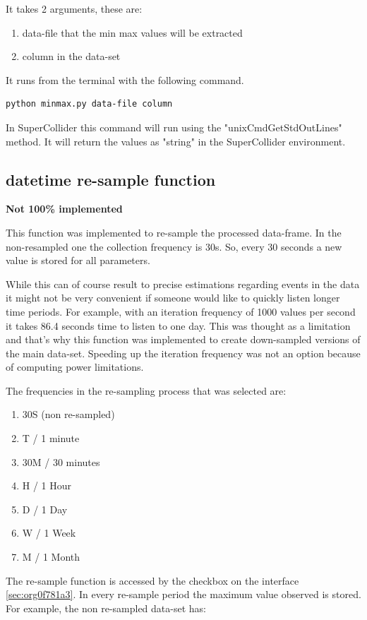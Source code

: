 \documentclass[11pt]{article}
\begin{document}
It takes 2 arguments, these are:
\begin{enumerate}
\item data-file that the min max values will be extracted
\item column in the data-set
\end{enumerate}

It runs from the terminal with the following command.
\begin{verbatim}
python minmax.py data-file column
\end{verbatim}

In SuperCollider this command will run using the "unixCmdGetStdOutLines" method.  It will return the values as "string" in the SuperCollider environment.

\subsection{datetime re-sample function}
\label{sec:orgabf1edc}
\textbf{Not 100\% implemented}

This function was implemented to re-sample the processed data-frame.  In the non-resampled one the collection frequency is 30s. So, every 30 seconds a new value is stored for all parameters.

While this can of course result to precise estimations regarding events in the data it might not be very convenient if someone would like to quickly listen longer time periods.  For example, with an iteration frequency of 1000 values per second it takes 86.4 seconds time to listen to one day.  This was thought as a limitation and that's why this function was implemented to create down-sampled versions of the main data-set.  Speeding up the iteration frequency was not an option because of computing power limitations.

The frequencies in the re-sampling process that was selected are:
\begin{enumerate}
\item 30S (non re-sampled)
\item T / 1 minute
\item 30M / 30 minutes
\item H / 1 Hour
\item D / 1 Day
\item W / 1 Week
\item M / 1 Month
\end{enumerate}

The re-sample function is accessed by the checkbox on the interface \ref{sec:org0f781a3}.  In every re-sample period the maximum value observed is stored.  For example, the non re-sampled data-set has:
\end{document}
